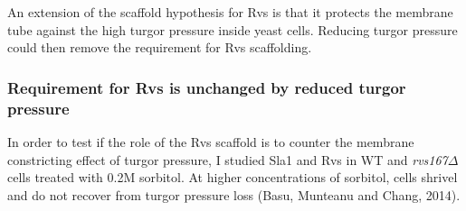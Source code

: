 
\newpage
An extension of the scaffold hypothesis for Rvs is that it protects the membrane tube against the high turgor pressure inside yeast cells. Reducing turgor pressure could then remove the requirement for Rvs scaffolding.

	\subsubsection{Requirement for Rvs is unchanged by reduced turgor pressure}

	In order to test if the role of the Rvs scaffold is to counter the membrane constricting effect of turgor pressure, I studied Sla1 and Rvs in WT and \textit{rvs167$\Delta$} cells treated with 0.2M sorbitol. At higher concentrations of sorbitol, cells shrivel and do not recover from turgor pressure loss (Basu, Munteanu and Chang, 2014).

